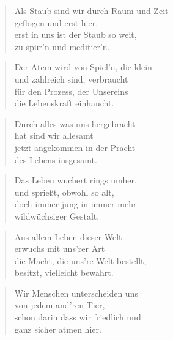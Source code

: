 \documentclass[10pt,a4paper]{article}
\begin{document}
\begin{paracol}{2}
\begin{verse}
Als Staub sind wir durch Raum und Zeit \\
geflogen und erst hier, \\
erst in uns ist der Staub so weit, \\
zu spür’n und meditier’n. \\
\end{verse}

\begin{verse}
Der Atem wird von Spiel’n, die klein \\
und zahlreich sind, verbraucht \\
für den Prozess, der Unsereins \\
die Lebenskraft einhaucht. \\
\end{verse}

\begin{verse}
Durch alles was uns hergebracht \\
hat sind wir allesamt \\
jetzt angekommen in der Pracht \\
des Lebens insgesamt. \\
\end{verse}

\begin{verse}
Das Leben wuchert rings umher, \\
und sprießt, obwohl so alt, \\
doch immer jung in immer mehr \\
wildwüchsiger Gestalt. \\
\end{verse}

\begin{verse}
Aus allem Leben dieser Welt \\
erwuchs mit uns’rer Art \\
die Macht, die uns’re Welt bestellt, \\
besitzt, vielleicht bewahrt. \\
\end{verse}

\begin{verse}
Wir Menschen unterscheiden uns \\
von jedem and’ren Tier, \\
schon darin dass wir friedlich und \\
ganz sicher atmen hier. \\
\end{verse}


\end{paracol}
\end{document}
